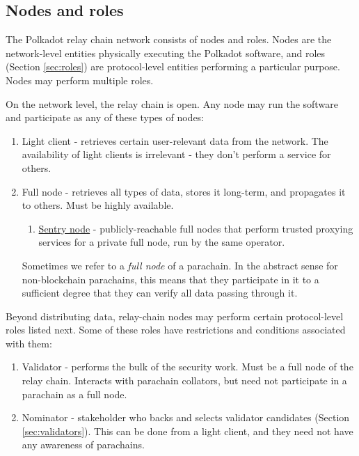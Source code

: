 \subsection{Nodes and roles}

The Polkadot relay chain network consists of nodes and roles. Nodes are the network-level entities physically executing the Polkadot software, and roles (Section \ref{sec:roles}) are protocol-level entities performing a particular purpose. Nodes may perform multiple roles.

On the network level, the relay chain is open. Any node may run the software and participate as any of these types of nodes:

\begin{enumerate}
\item Light client - retrieves certain user-relevant data from the network. The availability of light clients is irrelevant - they don't perform a service for others.
\item Full node - retrieves all types of data, stores it long-term, and propagates it to others. Must be highly available.
  \begin{enumerate}
  \item \hyperref[sec:net_sentry]{Sentry node} - publicly-reachable full nodes that perform trusted proxying services for a private full node, run by the same operator.
  \end{enumerate}
Sometimes we refer to a \emph{full node} of a parachain. In the abstract sense for non-blockchain parachains, this means that they participate in it to a sufficient degree that they can verify all data passing through it.
\end{enumerate}

Beyond distributing data, relay-chain nodes may perform certain protocol-level roles listed next. Some of these roles have restrictions and conditions associated with them:

\begin{enumerate}
\item Validator - performs the bulk of the security work. Must be a full node of the relay chain. Interacts with parachain collators, but need not participate in a parachain as a full node. %
\item Nominator - stakeholder who backs and selects validator candidates (Section \ref{sec:validators}). This can be done from a light client, and they need not have any awareness of parachains.
\end{enumerate}

